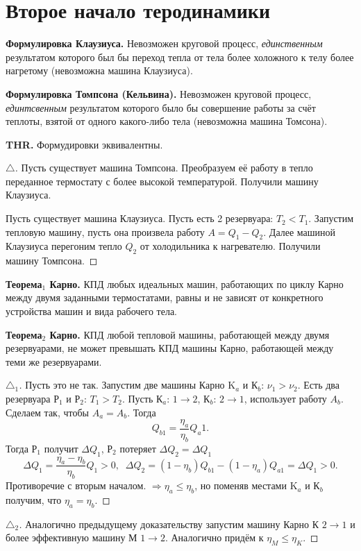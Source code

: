 \section{Второе начало теродинамики}

\noindent
\textbf{Формулировка Клаузиуса.} Невозможен круговой процесс, \textit{единственным} результатом которого был бы переход тепла от тела более холожного к телу более нагретому (невозможна машина Клаузиуса). 

\phantom{42}

\noindent
\textbf{Формулировка Томпсона (Кельвина).} Невозможен круговой процесс, \textit{единтсвенным} результатом которого было бы совершение работы за счёт теплоты, взятой от одного какого-либо тела (невозможна машина Томсона).

\phantom{42}

\noindent
\textbf{THR.} Формудировки эквивалентны.

\begin{proof}[$\triangle$]
Пусть существует машина Томпсона. Преобразуем её работу в тепло переданное термостату с более высокой температурой. Получили машину Клаузиуса.  

Пусть существует машина Клаузиуса. Пусть есть 2 резервуара: $T_2 < T_1$. Запустим тепловую машину, пусть она произвела работу $A = Q_1 - Q_2$. Далее машиной Клаузиуса перегоним тепло $Q_2$ от холодильника к нагревателю. Получили машину Томпсона.   
\end{proof}

\phantom{42}

\noindent
\textbf{Теорема$_1$ Карно.}  КПД любых идеальных машин, работающих по циклу Карно между двумя заданными термостатами, равны и не зависят от конкретного устройства машин и вида рабочего тела.

\phantom{42}

\noindent
\textbf{Теорема$_2$ Карно.}  КПД любой тепловой машины, работающей между двумя резервуарами, не может превышать КПД машины Карно, работающей между теми же резервуарами.

\begin{proof}[$\triangle_1$]
Пусть это не так. Запустим две машины Карно K$_a$ и К$_b$: $\nu_1 > \nu_2$. Есть два резервуара Р$_1$ и Р$_2$: $T_1 > T_2$. Пусть К$_a$: $1 \to 2$, К$_b$: $2 \to 1$, использует работу $A_b$. Сделаем так, чтобы $A_a = A_b$. Тогда
$$
Q_{b1} = \frac{\eta_a}{\eta_b} Q_a1.
$$
Тогда Р$_1$ получит $\Delta Q_1$,  Р$_2$ потеряет $\Delta Q_2 = \Delta Q_1$
$$
\Delta Q_1 = \frac{\eta_a - \eta_b}{\eta_b} Q_1 > 0, \; \; 
\Delta Q_2 = (1 - \eta_b)Q_{b1} - (1-\eta_a)Q_{a1} = \Delta Q_1 >0.
$$
Противоречие с вторым началом. $\Rightarrow \eta_a \leqslant \eta_b$, но поменяв местами K$_a$ и К$_b$ получим, что  $\eta_a = \eta_b$.


\end{proof}
\begin{proof}[$\triangle_2$]
Аналогично предыдущему доказательству запустим машину Карно К $2 \to 1$ и более эффективную машину М $1 \to 2$. Аналогично придём к $\eta_M \leqslant \eta_K$.
\end{proof}

